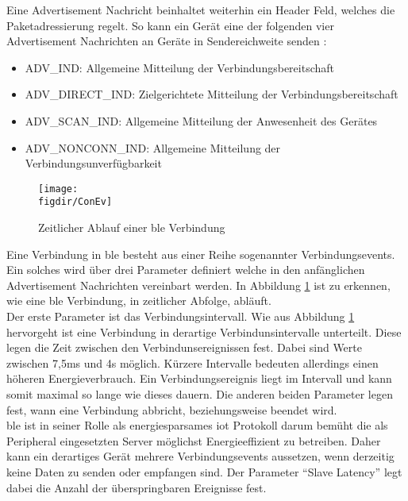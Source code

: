 \noindent Eine Advertisement Nachricht beinhaltet weiterhin ein Header Feld, welches die Paketadressierung regelt. So kann ein Gerät eine der folgenden vier Advertisement Nachrichten an Geräte in Sendereichweite senden \cite[Seite 22]{Townsend14:GSB}:
\begin{itemize}
	\item{ADV\_IND: Allgemeine Mitteilung der Verbindungsbereitschaft}
	\item{ADV\_DIRECT\_IND: Zielgerichtete Mitteilung der Verbindungsbereitschaft}
	\item{ADV\_SCAN\_IND: Allgemeine Mitteilung der Anwesenheit des Gerätes}
	\item{ADV\_NONCONN\_IND: Allgemeine Mitteilung der Verbindungsunverfügbarkeit}
\end{itemize} 

\begin{figure}[!b]
	\centering
	\texttt{[image: \\figdir/ConEv]}
	\caption{Zeitlicher Ablauf einer \ac{ble} Verbindung \cite[Seite 22]{Townsend14:GSB}}
	\label{FIG:ConEv}
\end{figure}

\noindent Eine Verbindung in \ac{ble} besteht aus einer Reihe sogenannter Verbindungsevents. Ein solches wird über drei Parameter definiert welche in den anfänglichen Advertisement Nachrichten vereinbart werden. In Abbildung \ref{FIG:ConEv} ist zu erkennen, wie eine \ac{ble} Verbindung, in zeitlicher Abfolge, abläuft.\\

\noindent Der erste Parameter ist das Verbindungsintervall. Wie aus Abbildung \ref{FIG:ConEv} hervorgeht ist eine Verbindung in derartige Verbindunsintervalle unterteilt. Diese legen die Zeit zwischen den Verbindunsereignissen fest. Dabei sind Werte zwischen 7,5ms und 4s möglich. Kürzere Intervalle bedeuten allerdings einen höheren Energieverbrauch. Ein Verbindungsereignis liegt im Intervall und kann somit maximal so lange wie dieses dauern. Die anderen beiden Parameter legen fest, wann eine Verbindung abbricht, beziehungsweise beendet wird.\\ 

\noindent \ac{ble} ist in seiner Rolle als energiesparsames \ac{iot} Protokoll darum bemüht die als Peripheral eingesetzten Server möglichst Energieeffizient zu betreiben. Daher kann ein derartiges Gerät mehrere Verbindungsevents aussetzen, wenn derzeitig keine Daten zu senden oder empfangen sind. Der Parameter "`Slave Latency"' legt dabei die Anzahl der überspringbaren Ereignisse fest.\\

